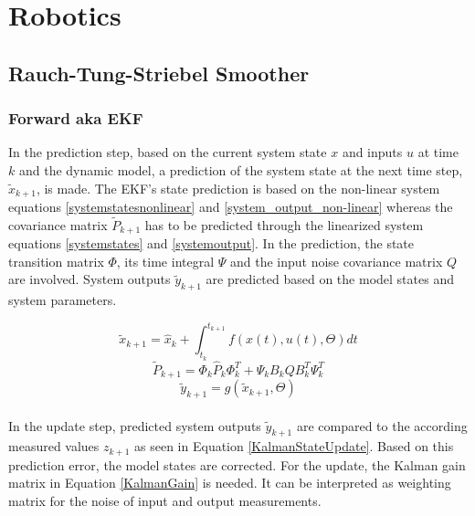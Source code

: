 \chapter{Robotics}

\section{Rauch-Tung-Striebel Smoother}
\subsection{Forward aka EKF}
In the prediction step, based on the current system state $x$ and inputs $u$ at time $k$ and the dynamic model, a prediction of the system state at the next time step, $\widetilde{x}_{k+1}$, is made. The EKF's state prediction is based on the non-linear system equations  \ref{systemstatesnonlinear} and \ref{system_output_non-linear} whereas the covariance matrix $\widetilde{P} _{k+1}$ has to be predicted through the linearized system equations  \ref{systemstates} and \ref{systemoutput}. In the prediction, the state transition matrix $\Phi$, its time integral $\Psi$ and the input noise covariance matrix $Q$ are involved. System outputs $\widetilde{y}_{k+1}$ are predicted based on the model states and system parameters.

\begin{equation}
\widetilde{x} _{k+1} = \widehat{x} _{k} + \int_{t_{k}}^{t_{k+1}} f(x(t), u(t), \Theta)dt \label{KalmanStatePrediction}
\end{equation}
\begin{equation}
\widetilde{P} _{k+1} = \Phi_{k} \widehat{P}_k\Phi_{k}^T + \Psi_{k}B_{k}QB_{k}^T\Psi_{k}^T
\label{CovariancePrediction}
\end{equation}
\begin{equation}
\widetilde{y}_{k+1}= g(\widetilde{x} _{k+1},\Theta) \label{SystemOutputsKalman}
\end{equation}\\
In the update step, predicted system outputs $\widetilde{y}_{k+1}$ are compared to the according measured values $z_{k+1}$ as seen in Equation \ref{KalmanStateUpdate}. Based on this prediction error, the model states are corrected. For the update, the Kalman gain matrix in Equation \ref{KalmanGain} is needed. It can be interpreted as weighting matrix for the noise of input and output measurements.

